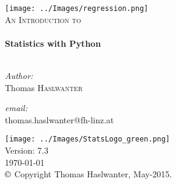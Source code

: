 \begin{titlepage}

\begin{center}


\texttt{[image: ../Images/regression.png]}\\[2cm]


\textsc{\Large An Introduction to}\\[0.5cm]


\HRule \\[0.4cm]
{ \huge \bfseries Statistics with Python}\\[0.4cm]

\HRule \\[1.5cm]

\begin{minipage}{0.4\textwidth}
\begin{flushleft} \large
\emph{Author:}\\
Thomas \textsc{Haslwanter}
\end{flushleft}
\end{minipage}
\begin{minipage}{0.4\textwidth}
\begin{flushright} \large
\emph{email:} \\
{\small thomas.haslwanter@fh-linz.at}
\end{flushright}
\end{minipage}

\vfill

\texttt{[image: ../Images/StatsLogo\_green.png]}\\
Version: 7.3 \\
{\large \today} \\[1cm]
\footnotesize{$\copyright$ Copyright Thomas Haslwanter, May-2015.}


\end{center}

\end{titlepage}
